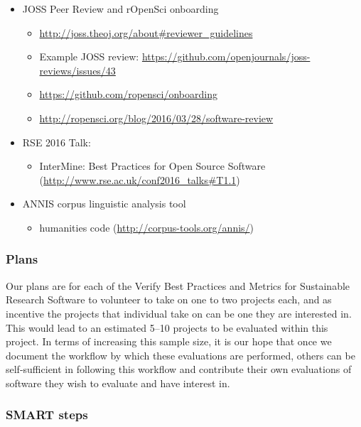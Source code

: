 \begin{itemize}
\item JOSS Peer Review and rOpenSci onboarding
\begin{itemize} 
\item \url{http://joss.theoj.org/about#reviewer_guidelines} 
\item Example JOSS review: \url{https://github.com/openjournals/joss-reviews/issues/43}
\item \url{https://github.com/ropensci/onboarding}
\item \url{http://ropensci.org/blog/2016/03/28/software-review}
\end{itemize}

\item RSE 2016 Talk:
\begin{itemize}
\item InterMine: Best Practices for Open Source Software (\url{http://www.rse.ac.uk/conf2016_talks#T1.1})
\end{itemize}

\item ANNIS corpus linguistic analysis tool
\begin{itemize}
\item humanities code (\url{http://corpus-tools.org/annis/})
\end{itemize}

\end{itemize}


\subsubsection{Plans}

Our plans are for each of the Verify Best Practices and Metrics for Sustainable Research Software to volunteer to take on one to two projects each, and as incentive the projects that individual take on can be one they are interested in.  This would lead to an estimated 5--10 projects to be evaluated within this project.  In terms of increasing this sample size, it is our hope that once we document the workflow by which these evaluations are performed, others can be self-sufficient in following this workflow and contribute their own evaluations of software they wish to evaluate and have interest in.

\subsubsection{SMART steps}


